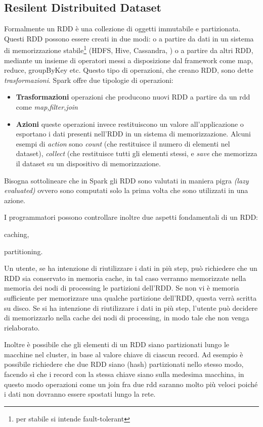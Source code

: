 \subsection{Resilent Distribuited Dataset}
Formalmente un RDD è una collezione di oggetti immutabile e partizionata.
Questi RDD possono essere creati in due modi: o a partire da dati in un sistema di memorizzazione stabile\footnote{per stabile si intende fault-tolerant} (HDFS, Hive, Cassandra, ) o a partire da altri RDD, mediante un insieme di operatori messi a disposizione dal framework come map, reduce, groupByKey etc. 
Questo tipo di  operazioni, che creano RDD, sono dette \emph{trasformazioni}. Spark offre due tipologie di operazioni:
\begin{itemize}
\item \textbf{Trasformazioni} operazioni che producono nuovi RDD a partire da un rdd come \emph{map,filter,join}
\item \textbf{Azioni} queste operazioni invece restituiscono un valore all'applicazione o esportano i dati presenti nell'RDD in un sistema di memorizzazione.
Alcuni esempi di \emph{action} sono \emph{count} (che restituisce il numero di elementi nel dataset), \emph{collect} (che restituisce tutti gli elementi stessi, e \emph{save} che  memorizza il dataset su un dispositivo di memorizzazione.
\end{itemize}
Bisogna sottolineare che in Spark gli RDD  sono valutati in maniera pigra \emph{(lazy evaluated)} ovvero sono computati solo la prima volta che sono utilizzati in una azione.
 

I programmatori possono controllare inoltre due aspetti fondamentali di un RDD: 
\begin{inlinelist}
  \item caching,
  \item partitioning.
\end{inlinelist}
 Un utente, se  ha intenzione di riutilizzare i dati in più step, può richiedere che un RDD sia conservato in memoria cache, in tal caso verranno memorizzate nella memoria dei nodi di processing le partizioni dell'RDD.  Se  non vi è memoria sufficiente per memorizzare una qualche partizione dell'RDD, questa verrà scritta su disco.
Se si ha intenzione di riutilizzare i dati in più step, l'utente può decidere di memorizzarlo nella cache dei nodi di processing, in modo tale che non venga  rielaborato. 

 

Inoltre è possibile che gli elementi di un RDD siano partizionati lungo le macchine nel cluster, in base al valore chiave di ciascun record. Ad esempio è possibile richiedere che due RDD siano (hash) partizionati nello stesso modo, facendo sì che i record con la stessa chiave siano sulla medesima macchina, in questo modo operazioni come un join fra due rdd 
saranno molto più veloci poiché i dati non dovranno essere spostati lungo la rete.
 
